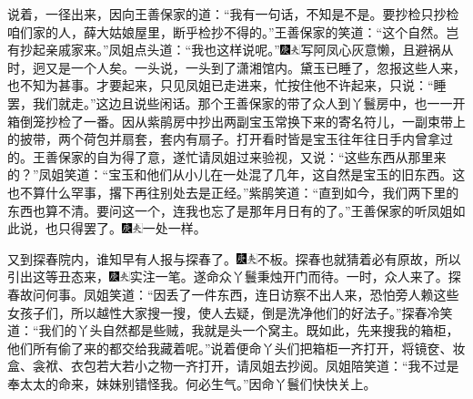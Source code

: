 说着，一径出来，因向王善保家的道：``我有一句话，不知是不是。要抄检只抄检咱们家的人，薛大姑娘屋里，断乎检抄不得的。''王善保家的笑道：``这个自然。岂有抄起亲戚家来。''凤姐点头道：``我也这样说呢。''{\includegraphics[width=3mm]{../Images/00004}\includegraphics[width=3mm]{../Images/00012}\footnotesize \kaishu 写阿凤心灰意懒，且避祸从时，迥又是一个人矣。}一头说，一头到了潇湘馆内。黛玉已睡了，忽报这些人来，也不知为甚事。才要起来，只见凤姐已走进来，忙按住他不许起来，只说：``睡罢，我们就走。''这边且说些闲话。那个王善保家的带了众人到丫鬟房中，也一一开箱倒笼抄检了一番。因从紫鹃房中抄出两副宝玉常换下来的寄名符儿，一副束带上的披带，两个荷包并扇套，套内有扇子。打开看时皆是宝玉往年往日手内曾拿过的。王善保家的自为得了意，遂忙请凤姐过来验视，又说：``这些东西从那里来的？''凤姐笑道：``宝玉和他们从小儿在一处混了几年，这自然是宝玉的旧东西。这也不算什么罕事，撂下再往别处去是正经。''紫鹃笑道：``直到如今，我们两下里的东西也算不清。要问这一个，连我也忘了是那年月日有的了。''王善保家的听凤姐如此说，也只得罢了。{\includegraphics[width=3mm]{../Images/00004}\includegraphics[width=3mm]{../Images/00012}\footnotesize \kaishu 一处一样。}

又到探春院内，谁知早有人报与探春了。{\includegraphics[width=3mm]{../Images/00004}\includegraphics[width=3mm]{../Images/00012}\footnotesize \kaishu 不板。}探春也就猜着必有原故，所以引出这等丑态来，{\includegraphics[width=3mm]{../Images/00004}\includegraphics[width=3mm]{../Images/00012}\footnotesize \kaishu 实注一笔。}遂命众丫鬟秉烛开门而待。一时，众人来了。探春故问何事。凤姐笑道：``因丢了一件东西，连日访察不出人来，恐怕旁人赖这些女孩子们，所以越性大家搜一搜，使人去疑，倒是洗净他们的好法子。''探春冷笑道：``我们的丫头自然都是些贼，我就是头一个窝主。既如此，先来搜我的箱柜，他们所有偷了来的都交给我藏着呢。''说着便命丫头们把箱柜一齐打开，将镜奁、妆盒、衾袱、衣包若大若小之物一齐打开，请凤姐去抄阅。凤姐陪笑道：``我不过是奉太太的命来，妹妹别错怪我。何必生气。''因命丫鬟们快快关上。

